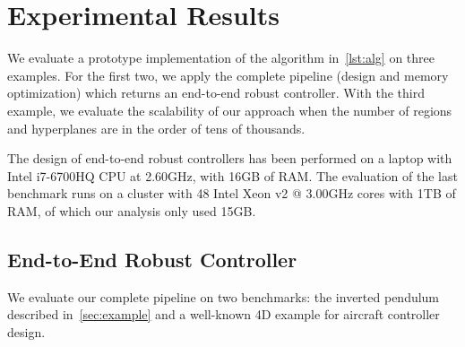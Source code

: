 \section{Experimental Results}



We evaluate a prototype implementation of the algorithm in~\autoref{lst:alg}
on three examples. For the first two, we apply the complete pipeline (design and memory optimization)
which returns an end-to-end robust controller. With the third example, we evaluate
the scalability of our approach when the number of regions and hyperplanes are in
the order of tens of thousands.


The design of end-to-end robust controllers has been performed on a laptop with Intel i7-6700HQ CPU at
2.60GHz, with 16GB of RAM. The evaluation of the last benchmark runs on a
cluster with 48 Intel Xeon v2 @ 3.00GHz cores with 1TB of RAM, of which our analysis
only used 15GB.

\subsection{End-to-End Robust Controller}

We evaluate our complete pipeline on two benchmarks: the inverted pendulum
described in~\autoref{sec:example} and a well-known 4D example for aircraft
controller design.

